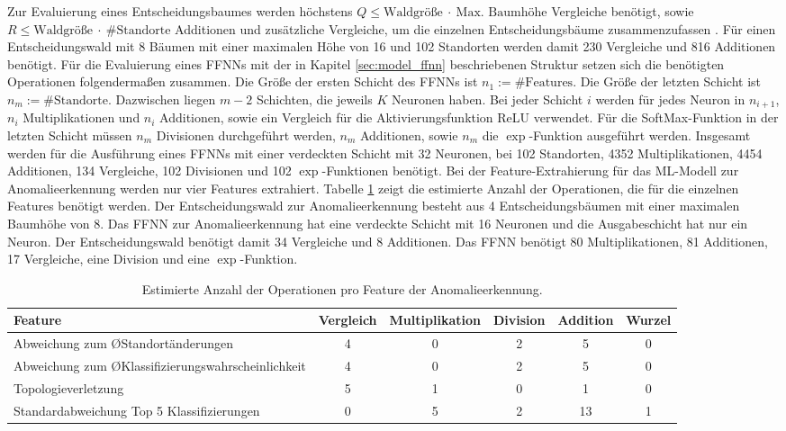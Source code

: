 \newline
\newline
Zur Evaluierung eines Entscheidungsbaumes werden höchstens $Q\leq\text{Waldgröße}\ \cdot\ \text{Max. Baumhöhe}$ Vergleiche benötigt,
sowie $R\leq\text{Waldgröße}\ \cdot\ \text{\#Standorte}$ Additionen und  zusätzliche Vergleiche, um die einzelnen Entscheidungsbäume zusammenzufassen \cite{dymelThesis}.
Für einen Entscheidungswald mit 8 Bäumen mit einer maximalen Höhe von 16 und 102 Standorten werden damit 230 Vergleiche und 816 Additionen benötigt.
\newline
\newline
Für die Evaluierung eines FFNNs mit der in Kapitel \ref{sec:model_ffnn} beschriebenen Struktur setzen sich die benötigten Operationen folgendermaßen zusammen.
Die Größe der ersten Schicht des FFNNs ist $n_1:=\text{\#Features}$.
Die Größe der letzten Schicht ist $n_m:=\text{\#Standorte}$.
Dazwischen liegen $m-2$ Schichten, die jeweils $K$ Neuronen haben.
Bei jeder Schicht $i$ werden für jedes Neuron in $n_{i+1}$, $n_i$ Multiplikationen und $n_i$ Additionen, sowie ein Vergleich für die Aktivierungsfunktion ReLU verwendet.
Für die SoftMax-Funktion in der letzten Schicht müssen $n_m$ Divisionen durchgeführt werden, $n_m$ Additionen, sowie $n_m$ die $\exp$-Funktion ausgeführt werden.
Insgesamt werden für die Ausführung eines FFNNs mit einer verdeckten Schicht mit 32 Neuronen,
bei 102 Standorten, 4352 Multiplikationen, 4454 Additionen, 134 Vergleiche, 102 Divisionen und 102 $\exp$-Funktionen benötigt.
\newline
\newline
Bei der Feature-Extrahierung für das ML-Modell zur Anomalieerkennung werden nur vier Features extrahiert.
Tabelle \ref{tab:anomaly_feature_operation_complexity} zeigt die estimierte Anzahl der Operationen, die für die einzelnen Features benötigt werden.
Der Entscheidungswald zur Anomalieerkennung besteht aus 4 Entscheidungsbäumen mit einer maximalen Baumhöhe von 8.
Das FFNN zur Anomalieerkennung hat eine verdeckte Schicht mit 16 Neuronen und die Ausgabeschicht hat nur ein Neuron.
Der Entscheidungswald benötigt damit 34 Vergleiche und 8 Additionen.
Das FFNN benötigt 80 Multiplikationen, 81 Additionen, 17 Vergleiche, eine Division und eine $\exp$-Funktion.
\begin{table}[h!]
    \centering
    \begin{tabular}{ | p{4.5cm} | c | c | c | c | c | }
        \hline
        Feature & Vergleich & Multiplikation & Division & Addition & Wurzel \\\hline
        Abweichung zum ØStandortänderungen & 4 & 0 & 2 & 5 & 0 \\\hline
        Abweichung zum ØKlassifizierungswahrscheinlichkeit & 4 & 0 & 2 & 5 & 0 \\\hline
        Topologieverletzung & 5 & 1 & 0 & 1 & 0 \\\hline
        Standardabweichung Top 5 Klassifizierungen & 0 & 5 & 2 & 13 & 1 \\\hline
    \end{tabular}
    \caption{Estimierte Anzahl der Operationen pro Feature der Anomalieerkennung.}
    \label{tab:anomaly_feature_operation_complexity}
\end{table}
